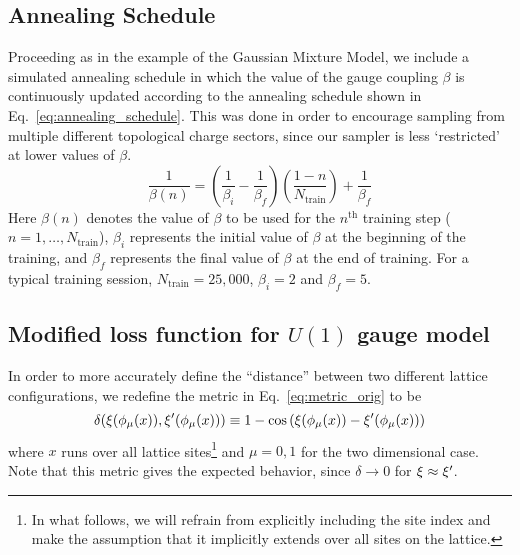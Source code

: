 \documentclass[../main.tex]{subfiles}
\begin{document}
\subsection{Annealing Schedule}%
\label{subsec:l2hmc_u1annealing}
%
Proceeding as in the example of the Gaussian Mixture Model, we include a simulated annealing
schedule in which the value of the gauge coupling $\beta$ is continuously updated according to the annealing schedule
shown in Eq.~\ref{eq:annealing_schedule}.
%
%
This was done in order to encourage sampling from multiple different topological charge sectors, since our sampler is
less `restricted' at lower values of $\beta$.
\begin{equation}
  \frac{1}{\beta(n)} = {\left(\frac{1}{\beta_{i}} - \frac{1}{\beta_{f}}\right)} {\left(\frac{1 -
  n}{N_{\mathrm{train}}}\right)} + \frac{1}{\beta_{f}}
    \label{eq:annealing_schedule}
\end{equation}
%
Here $\beta(n)$ denotes the value of $\beta$ to be used for the $n^{\mathrm{th}}$ training step ($n = 1, \ldots,
N_{\mathrm{train}}$), $\beta_{i}$ represents the initial value of $\beta$ at the beginning of the training, and
$\beta_{f}$ represents the final value of $\beta$ at the end of training.
%
For a typical training session, $N_{\mathrm{train}} = 25,000$, $\beta_{i} = 2$ and $\beta_{f} = 5$.
%

%
\subsection{Modified loss function for \texorpdfstring{$U(1)$}{U (1)} gauge model}
\label{subsec:l2hmc_modifiedloss}
%
In order to more accurately define the ``distance'' between two different lattice configurations, we redefine the
metric in Eq.~\ref{eq:metric_orig} to be
%
\begin{equation}
  \delta(\xi(\phi_{\mu}(x)), {\xi^{\prime}}(\phi_{\mu}(x))) \equiv 1 - \cos\left(\xi(\phi_{\mu}(x)) - \xi^{\prime}(\phi_{\mu}(x))\right)
  \label{eq:metric_new}
\end{equation}
%
where $x$ runs over all lattice sites\footnote{In what follows, we will refrain from explicitly including the site
index and make the assumption that it implicitly extends over all sites on the lattice.} and  $\mu=0, 1$ for the two
dimensional case.
%
Note that this metric gives the expected behavior, since $\delta \rightarrow 0$ for $\xi \approx {\xi^{\prime}}$.
\end{document}
